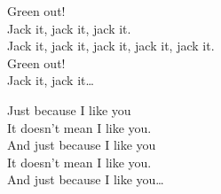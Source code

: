 Green out! \\

Jack it, jack it, jack it. \\
Jack it, jack it, jack it, jack it, jack it. \\

Green out! \\

Jack it, jack it… \\




Just because I like you \\
It doesn't mean I like you. \\

And just because I like you \\
It doesn't mean I like you. \\

And just because I like you… \\
